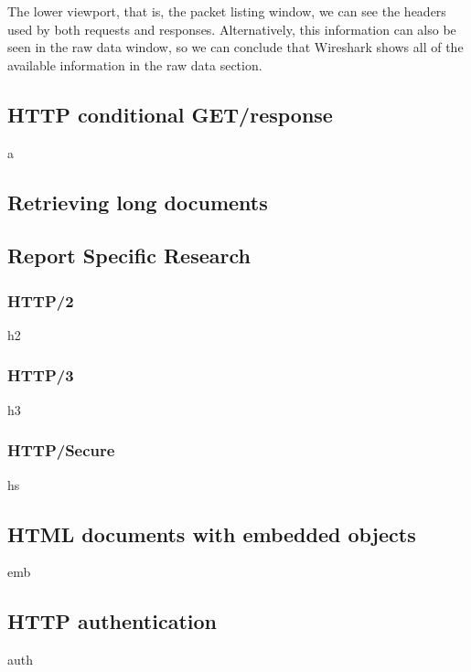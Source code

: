The lower viewport, that is, the packet listing window, we can see the headers
used by both requests and responses. Alternatively, this information can also
be seen in the raw data window, so we can conclude that Wireshark shows all of
the available information in the raw data section.

\subsection{HTTP conditional GET/response}
a

\subsection{Retrieving long documents}

\subsection{Report Specific Research}

\subsubsection{HTTP/2}
h2

\subsubsection{HTTP/3}
h3

\subsubsection{HTTP/Secure}
hs

\subsection{HTML documents with embedded objects}
emb

\subsection{HTTP authentication}
auth